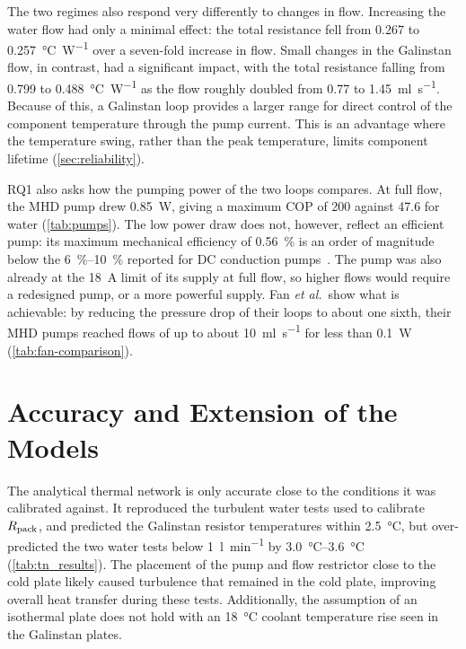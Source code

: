 The two regimes also respond very differently to changes in flow. Increasing the water flow
had only a minimal effect: the total resistance fell from 0.267 to
\SI{0.257}{\celsius\per\watt} over a seven-fold increase in flow. Small changes
in the Galinstan flow, in contrast, had a significant impact, with the total
resistance falling from 0.799 to \SI{0.488}{\celsius\per\watt} as the flow
roughly doubled from 0.77 to \SI{1.45}{\milli\litre\per\second}. Because of this,
a Galinstan loop provides a larger range for direct control of the component
temperature through the pump current. This is an advantage where the
temperature swing, rather than the peak temperature, limits component lifetime
(\cref{sec:reliability}).

RQ1 also asks how the pumping power of the two loops compares. At full flow, the
MHD pump drew \SI{0.85}{\watt}, giving a maximum COP of 200 against 47.6 for water
(\cref{tab:pumps}). The low power draw does not, however, reflect an efficient
pump: its maximum mechanical efficiency of \SI{0.56}{\percent} is an order of
magnitude below the \SIrange{6}{10}{\percent} reported for DC conduction
pumps~\cite{an_liquid_2024,hodes_potential_2014}. The pump was also already at
the \SI{18}{\ampere} limit of its supply at full flow, so higher flows would
require a redesigned pump, or a more powerful supply. Fan \emph{et al.}\ show what is achievable: by
reducing the pressure drop of their loops to about one sixth, their MHD pumps
reached flows of up to about \SI{10}{\milli\litre\per\second} for less than
\SI{0.1}{\watt}~\cite{fan_liquid_2021,fan_high_2023} (\cref{tab:fan-comparison}).

\section{Accuracy and Extension of the Models}
\label{sec:disc-models}

The analytical thermal network is only accurate close to the conditions it was
calibrated against. It reproduced the turbulent water tests used to calibrate
$R_{\mathrm{pack}}$, and predicted the Galinstan resistor temperatures within
\SI{2.5}{\celsius}, but over-predicted the two water tests below \SI{1}{\litre\per\minute} by
\SIrange{3.0}{3.6}{\celsius} (\cref{tab:tn_results}). The placement of the pump 
and flow restrictor close to the cold plate likely caused turbulence that remained in the cold plate, improving overall heat transfer during these tests. 
Additionally, the assumption of an isothermal plate does not hold with an
\SI{18}{\celsius} coolant temperature rise seen in the Galinstan plates.

